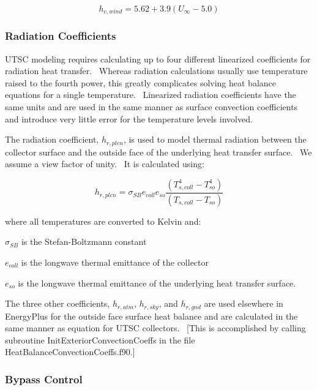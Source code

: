 \begin{equation}
{h_{c,wind}} = 5.62 + 3.9({U_\infty } - 5.0)
\end{equation}

\subsubsection{Radiation Coefficients}\label{radiation-coefficients-000}

UTSC modeling requires calculating up to four different linearized coefficients for radiation heat transfer.~ Whereas radiation calculations usually use temperature raised to the fourth power, this greatly complicates solving heat balance equations for a single temperature.~ Linearized radiation coefficients have the same units and are used in the same manner as surface convection coefficients and introduce very little error for the temperature levels involved.

The radiation coefficient, \({h_{r,plen}}\), is used to model thermal radiation between the collector surface and the outside face of the underlying heat transfer surface.~ We assume a view factor of unity.~ It is calculated using:

\begin{equation}
{h_{r,plen}} = {\sigma_{SB}}{e_{coll}}{e_{so}}\frac{{\left( {T_{s,coll}^4 - T_{so}^4} \right)}}{{\left( {{T_{s,coll}} - {T_{so}}} \right)}}
\end{equation}

where all temperatures are converted to Kelvin and:

\({\sigma_{SB}}\) is the Stefan-Boltzmann constant

\({e_{coll}}\) is the longwave thermal emittance of the collector

\({e_{so}}\) is the longwave thermal emittance of the underlying heat transfer surface.

The three other coefficients, \({h_{r,atm}}\), \({h_{r,sky}}\), and \({h_{r,gnd}}\) are used elsewhere in EnergyPlus for the outside face surface heat balance and are calculated in the same manner as equation for UTSC collectors.~ {[}This is accomplished by calling subroutine InitExteriorConvectionCoeffs in the file HeatBalanceConvectionCoeffs.f90.{]}

\subsubsection{Bypass Control}\label{bypass-control}

